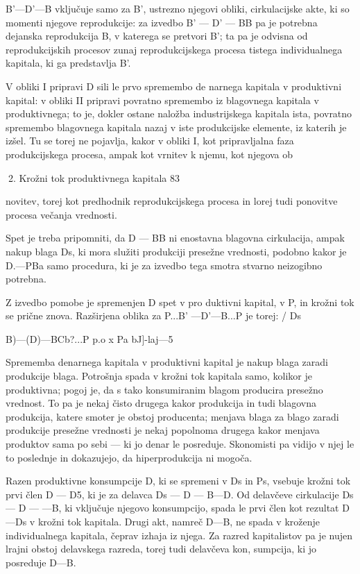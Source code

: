 \documentclass[kapital_02.tex]{subfiles}
\begin{document}
B'—D'—B vključuje samo za B', ustrezno njegovi obliki, cirkulacijske akte, ki so momenti njegove reprodukcije: za izvedbo B' — D' — BB pa je potrebna dejanska reprodukcija B, v katerega se pretvori B'; ta pa je odvisna od reprodukcijskih procesov zunaj reprodukcijskega procesa tistega individualnega kapitala, ki ga predstavlja B'.

V obliki I pripravi D sili le prvo spremembo de narnega kapitala v produktivni kapital: v obliki II pripravi povratno spremembo iz blagovnega kapitala v produktivnega; to je, dokler ostane naložba industrijskega kapitala ista, povratno spremembo blagovnega kapitala nazaj v iste produkcijske elemente, iz katerih je izšel. Tu se torej ne pojavlja, kakor v obliki I, kot pripravljalna faza produkcijskega procesa, ampak kot vrnitev k njemu, kot njegova ob





2. Krožni tok produktivnega kapitala 83



 novitev, torej kot predhodnik reprodukcijskega procesa in lorej tudi ponovitve procesa večanja vrednosti.

Spet je treba pripomniti, da D — BB ni enostavna blagovna cirkulacija, ampak nakup blaga Ds, ki mora služiti produkciji presežne vrednosti, podobno kakor je D.—PBa samo procedura, ki je za izvedbo tega smotra stvarno neizogibno potrebna.

Z izvedbo pomobe je spremenjen D spet v pro duktivni kapital, v P, in krožni tok se prične znova. Razširjena oblika za P...B' —D'—B...P je torej: / Ds

B)—(D)—BCb?...P p.o x Pa bJ]-laj—5

Sprememba denarnega kapitala v produktivni kapital je nakup blaga zaradi produkcije blaga. Potrošnja spada v krožni tok kapitala samo, kolikor je produktivna; pogoj je, da s tako konsumiranim blagom producira presežno vrednost. To pa je nekaj čisto drugega kakor produkcija in tudi blagovna produkcija, katere smoter je obstoj producenta; menjava blaga za blago zaradi produkcije presežne vrednosti je nekaj popolnoma drugega kakor menjava produktov sama po sebi — ki jo denar le posreduje. Skonomisti pa vidijo v njej le to poslednje in dokazujejo, da hiperprodukcija ni mogoča.

Razen produktivne konsumpcije D, ki se spremeni v Ds in Ps, vsebuje krožni tok prvi člen D — D5, ki je za delavca Ds — D — B—D. Od delavčeve cirkulacije Ds — D — —B, ki vključuje njegovo konsumpcijo, spada le prvi člen kot rezultat D —Ds v krožni tok kapitala. Drugi akt, namreč D—B, ne spada v kroženje individualnega kapitala, čeprav izhaja iz njega. Za razred kapitalistov pa je nujen lrajni obstoj delavskega razreda, torej tudi delavčeva kon, sumpcija, ki jo posreduje D—B.
\end{document}
